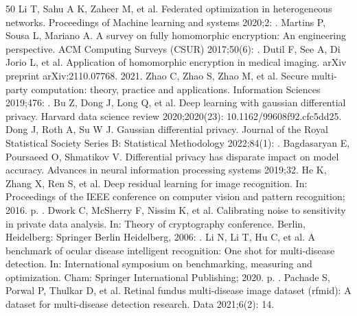\begin{thebibliography}{50}
Li T, Sahu A K, Zaheer M, et al. Federated optimization in heterogeneous networks. Proceedings of Machine learning and systems 2020;2: .
Martins P, Sousa L, Mariano A. A survey on fully homomorphic encryption: An engineering perspective. ACM Computing Surveys (CSUR) 2017;50(6): .
Dutil F, See A, Di Jorio L, et al. Application of homomorphic encryption in medical imaging. arXiv preprint arXiv:2110.07768. 2021.
Zhao C, Zhao S, Zhao M, et al. Secure multi-party computation: theory, practice and applications. Information Sciences 2019;476: .
Bu Z, Dong J, Long Q, et al. Deep learning with gaussian differential privacy. Harvard data science review 2020;2020(23): 10.1162/99608f92.cfc5dd25.
Dong J, Roth A, Su W J. Gaussian differential privacy. Journal of the Royal Statistical Society Series B: Statistical Methodology 2022;84(1): .
Bagdasaryan E, Poursaeed O, Shmatikov V. Differential privacy has disparate impact on model accuracy. Advances in neural information processing systems 2019;32.
He K, Zhang X, Ren S, et al. Deep residual learning for image recognition. In: Proceedings of the IEEE conference on computer vision and pattern recognition; 2016. p. .
Dwork C, McSherry F, Nissim K, et al. Calibrating noise to sensitivity in private data analysis. In: Theory of cryptography conference. Berlin, Heidelberg: Springer Berlin Heidelberg, 2006: .
Li N, Li T, Hu C, et al. A benchmark of ocular disease intelligent recognition: One shot for multi-disease detection. In: International symposium on benchmarking, measuring and optimization. Cham: Springer International Publishing; 2020. p. .
Pachade S, Porwal P, Thulkar D, et al. Retinal fundus multi-disease image dataset (rfmid): A dataset for multi-disease detection research. Data 2021;6(2): 14.

\end{thebibliography}
